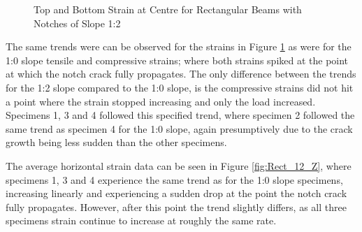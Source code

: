 \documentclass[11pt,a4paper]{article}
\numberwithin{equation}{subsection}
\begin{document}
\vspace*{\baselineskip}

\begin{figure}[h]
	\begin{center}
	\end{center}
	\caption{Top and Bottom Strain at Centre for Rectangular Beams with Notches of Slope 1:2}
	\label{fig:Rect_12_centre}
\end{figure}
\pagebreak

\noindent
The same trends were can be observed for the strains in Figure \ref{fig:Rect_12_centre} as were for the 1:0 slope tensile and compressive strains; where both strains spiked at the point at which the notch crack fully propagates. The only difference between the trends for the 1:2 slope compared to the 1:0 slope, is the compressive strains did not hit a point where the strain stopped increasing and only the load increased. Specimens 1, 3 and 4 followed this specified trend, where specimen 2 followed the same trend as specimen 4 for the 1:0 slope, again presumptively due to the crack growth being less sudden than the other specimens.

\vspace*{\baselineskip}
\noindent
The average horizontal strain data can be seen in Figure \ref{fig:Rect_12_Z}, where specimens 1, 3 and 4 experience the same trend as for the 1:0 slope specimens, increasing linearly and experiencing a sudden drop at the point the notch crack fully propagates. However, after this point the trend slightly differs, as all three specimens strain continue to increase at roughly the same rate. 

\vspace*{\baselineskip}
\end{document}
